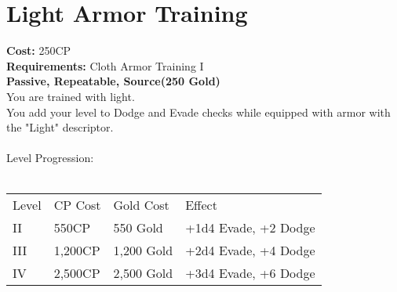 \section{Light Armor Training}\label{perk:lightArmorTraining}
\textbf{Cost:} 250CP\\
\textbf{Requirements:} Cloth Armor Training I\\
\textbf{Passive, Repeatable, Source(250 Gold)}\\
You are trained with light.\\
You add your level to Dodge and Evade checks while equipped with armor with the "Light" descriptor.\\
\\

Level Progression:\\
\\
\begin{tabular}{l | l | l | l}
	Level & CP Cost & Gold Cost & Effect\\
	II & 550CP & 550 Gold & +1d4 Evade, +2 Dodge\\
	III & 1,200CP & 1,200 Gold & +2d4 Evade, +4 Dodge\\
	IV & 2,500CP & 2,500 Gold & +3d4 Evade, +6 Dodge\\
\end{tabular}
